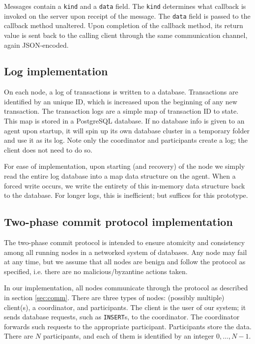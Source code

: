 \documentclass{article}
\begin{document}
\begin{multicols}{2}
Messages contain a \texttt{kind} and a \texttt{data} field.
The \texttt{kind} determines what callback is invoked on
the server upon receipt of the message. The \texttt{data}
field is passed to the callback method unaltered. Upon
completion of the callback method, its return value is sent
back to the calling client through the same communication
channel, again JSON-encoded.

\subsection{Log implementation}

On each node, a log of transactions is written to a 
database. Transactions are identified by an unique ID, 
which is increased upon the beginning of any new
transaction.
The transaction logs are a simple map of transaction ID to
state. This map is stored in a PostgreSQL database. If no
database info is given to an agent upon startup, it will 
spin up its own database cluster in a temporary folder and
use it as its log. Note only the coordinator and
participants create a log; the client does not need to do
so.

For ease of implementation, upon starting (and recovery) 
of the node we
simply read the entire log database into a map data
structure on the agent. When a forced write occurs, we
write the entirety of this in-memory data structure back
to the database. For longer logs, this is inefficient; but
suffices for this prototype.

\subsection{Two-phase commit protocol implementation}

The two-phase commit protocol is intended to ensure 
atomicity and consistency among all running nodes in a 
networked system of databases. Any node may fail at any
time, but we assume that all nodes are benign and follow
the protocol as specified, i.e. there
are no malicious/byzantine actions taken.

In our implementation, all nodes communicate through the
protocol as described in section \ref{sec:comm}. There are
three types of nodes: (possibly multiple) client(s), a
coordinator, and participants. The client is the user of our
system; it sends database requests, such as 
\texttt{INSERT}s, to the
coordinator. The coordinator forwards such requests to the
appropriate participant. Participants store the data. 
There are 
$N$ participants, and each of them is identified by an
integer $0, \dots, N-1$.


\end{multicols}
\end{document}
